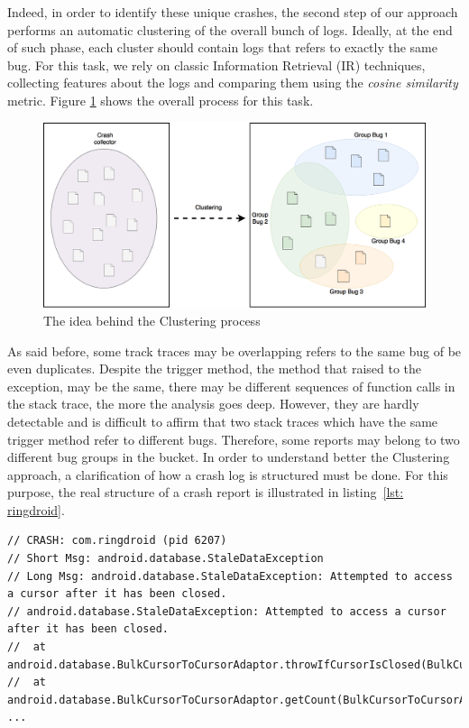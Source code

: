 
Indeed, in order to identify these unique crashes, the second step of our approach performs an automatic clustering of the overall bunch of logs. Ideally, at the end of such phase, each cluster should contain logs that refers to exactly the same bug.
For this task, we rely on classic Information Retrieval (IR) techniques, collecting features about the logs and comparing them using the \textit{cosine similarity} metric.
Figure \ref{fig: clustering} shows the overall process for this task. 
\begin{figure}[tb]
\centering 
\includegraphics[width=\columnwidth]{imgs/clusteringidea} 
\caption{The idea behind the Clustering process}
\label{fig: clustering}
\end{figure}
As said before, some track traces may be overlapping \ie refers to the same bug of be even duplicates. 
Despite the trigger method, \ie the method that raised to the exception, may be the same, there may be different sequences of function calls in the stack trace, the more the analysis goes deep. 
However, they are hardly detectable and is difficult to affirm that two stack traces which have the same trigger method refer to different bugs. 
Therefore, some reports may belong to two different bug groups in the bucket. 
In order to understand better the Clustering approach, a clarification of how a crash log is structured must be done. 
For this purpose, the real structure of a crash report is illustrated in listing~\ref{lst: ringdroid}. 
\begin{lstlisting}[caption=Structure of a crash log, basicstyle=\fontsize{6}{8}\ttfamily,label={lst: ringdroid}]
// CRASH: com.ringdroid (pid 6207)
// Short Msg: android.database.StaleDataException
// Long Msg: android.database.StaleDataException: Attempted to access a cursor after it has been closed.
// android.database.StaleDataException: Attempted to access a cursor after it has been closed.
// 	at android.database.BulkCursorToCursorAdaptor.throwIfCursorIsClosed(BulkCursorToCursorAdaptor.java:64)
// 	at android.database.BulkCursorToCursorAdaptor.getCount(BulkCursorToCursorAdaptor.java:70)
...
\end{lstlisting}
